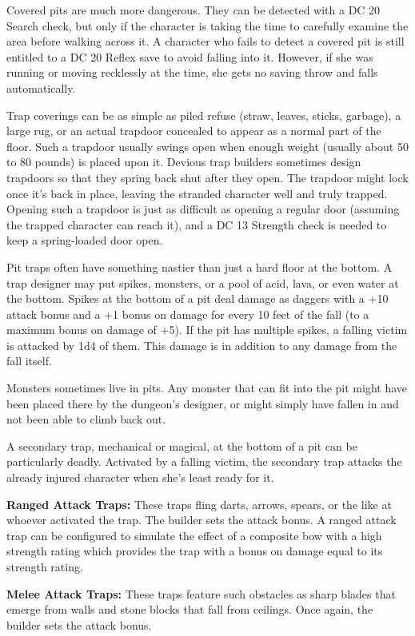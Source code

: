 \documentclass{article}
\begin{document}
Covered pits are much more dangerous. They can be detected with a DC 20 Search 
check, but only if the character is taking the time to carefully examine the area 
before walking across it. A character who fails to detect a covered pit is still 
entitled to a DC 20 Reflex save to avoid falling into it. However, if she was running 
or moving recklessly at the time, she gets no saving throw and falls automatically.

Trap coverings can be as simple as piled refuse (straw, leaves, sticks, garbage), 
a large rug, or an actual trapdoor concealed to appear as a normal part of the 
floor. Such a trapdoor usually swings open when enough weight (usually about 50 
to 80 pounds) is placed upon it. Devious trap builders sometimes design trapdoors 
so that they spring back shut after they open. The trapdoor might lock once it's 
back in place, leaving the stranded character well and truly trapped. Opening such 
a trapdoor is just as difficult as opening a regular door (assuming the trapped 
character can reach it), and a DC 13 Strength check is needed to keep a spring-loaded 
door open.

Pit traps often have something nastier than just a hard floor at the bottom. A 
trap designer may put spikes, monsters, or a pool of acid, lava, or even water 
at the bottom. Spikes at the bottom of a pit deal damage as daggers with a +10 
attack bonus and a +1 bonus on damage for every 10 feet of the fall (to a maximum 
bonus on damage of +5). If the pit has multiple spikes, a falling victim is attacked 
by 1d4 of them. This damage is in addition to any damage from the fall itself. 

Monsters sometimes live in pits. Any monster that can fit into the pit might have 
been placed there by the dungeon's designer, or might simply have fallen in and 
not been able to climb back out. 

A secondary trap, mechanical or magical, at the bottom of a pit can be particularly 
deadly. Activated by a falling victim, the secondary trap attacks the already injured 
character when she's least ready for it.

\textbf{Ranged Attack Traps: }These traps fling darts, arrows, spears, or the like 
at whoever activated the trap. The builder sets the attack bonus. A ranged attack 
trap can be configured to simulate the effect of a composite bow with a high strength 
rating which provides the trap with a bonus on damage equal to its strength rating.

\textbf{Melee Attack Traps: }These traps feature such obstacles as sharp blades 
that emerge from walls and stone blocks that fall from ceilings. Once again, the 
builder sets the attack bonus.
\end{document}
